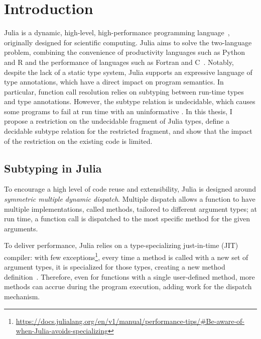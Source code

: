 \chapter{Introduction}

Julia is a dynamic, high-level, high-performance programming
language~\cite{bib:bezanson:julia-fresh:2017},
originally designed for scientific computing.
Julia aims to solve the two-language problem, combining the convenience of
productivity languages such as Python and R and the performance of languages
such as Fortran and C~\cite{bib:bezanson:julia-dyn-perf:oopsla:2018}.
Notably, despite the lack of a static type system,
Julia supports an expressive language of type annotations, which have a direct 
impact on program semantics. In particular, function call resolution relies on 
subtyping between run-time types and type annotations.
However, the subtype relation is undecidable, which causes some programs to
fail at run time with an uninformative .
In this thesis, I propose a restriction on the undecidable fragment of
Julia types, define a decidable subtype relation for the restricted fragment,
and show that the impact of the restriction on the existing code is limited.


\section{Subtyping in Julia}

To encourage a high level of code reuse and extensibility,
Julia is designed around \emph{symmetric multiple dynamic dispatch}.
Multiple dispatch allows a function to have multiple implementations, called
methods, tailored to different argument types; at run time, a function
call is dispatched to the most specific method for the given arguments.

To deliver performance, Julia relies on a type-specializing just-in-time (JIT)
compiler: with few exceptions\footnote{%
\url{https://docs.julialang.org/en/v1/manual/performance-tips/\#Be-aware-of-when-Julia-avoids-specializing}
}, %
every time a method is called with a new set of argument types,
it is specialized for those types, creating a new method
definition~\cite{bib:pelenitsyn:type-stability:oopsla:2021}.
Therefore, even for functions with a single user-defined method,
more methods can accrue during the program execution,
adding work for the dispatch mechanism.

